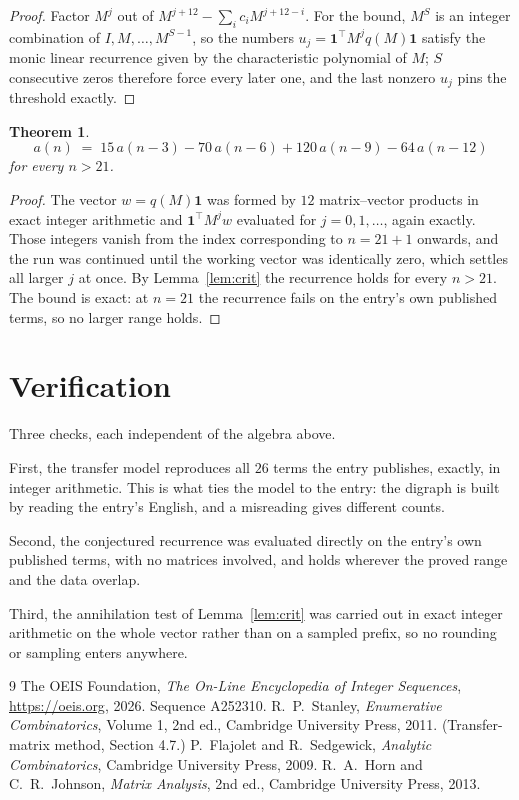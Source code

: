 \documentclass[11pt,a4paper]{article}
\theoremstyle{plain}
\newtheorem{theorem}{Theorem}
\theoremstyle{definition}
\begin{document}
\begin{proof}
Factor $M^{j}$ out of $M^{j+12}-\sum_ic_iM^{j+12-i}$. For the bound, $M^{S}$
is an integer combination of $I,M,\dots,M^{S-1}$, so the numbers
$u_j=\mathbf{1}^{\!\top}M^{j}q(M)\mathbf{1}$ satisfy the monic linear recurrence given by
the characteristic polynomial of $M$; $S$ consecutive zeros therefore force every later one,
and the last nonzero $u_j$ pins the threshold exactly.
\end{proof}

\begin{theorem}
\[
a(n)\;=\;15\,a(n-3) - 70\,a(n-6) + 120\,a(n-9) - 64\,a(n-12)
\]
for every $n>21$.
\end{theorem}

\begin{proof}
The vector $w=q(M)\mathbf{1}$ was formed by $12$ matrix--vector products in exact
integer arithmetic and $\mathbf{1}^{\!\top}M^{j}w$ evaluated for $j=0,1,\dots$, again
exactly. Those integers vanish from the index corresponding to $n=21+1$ onwards, and the
run was continued until the working vector was identically zero, which settles all larger $j$
at once. By Lemma~\ref{lem:crit} the recurrence holds for every $n>21$. The bound is exact: at $n=21$ the recurrence fails on the entry's own published terms, so no larger range holds.
\end{proof}

\section{Verification}

Three checks, each independent of the algebra above.

First, the transfer model reproduces all $26$ terms the entry publishes, exactly, in
integer arithmetic. This is what ties the model to the entry: the digraph is built by reading
the entry's English, and a misreading gives different counts.

Second, the conjectured recurrence was evaluated directly on the entry's own published terms,
with no matrices involved, and holds wherever the proved range and the data overlap.

Third, the annihilation test of Lemma~\ref{lem:crit} was carried out in exact integer
arithmetic on the whole vector rather than on a sampled prefix, so no rounding or sampling
enters anywhere.

\begin{thebibliography}{9}
 The OEIS Foundation, \emph{The On-Line Encyclopedia of Integer
Sequences}, \url{https://oeis.org}, 2026. Sequence A252310.
 R.~P.~Stanley, \emph{Enumerative Combinatorics}, Volume 1, 2nd ed.,
Cambridge University Press, 2011. (Transfer-matrix method, Section 4.7.)
 P.~Flajolet and R.~Sedgewick, \emph{Analytic Combinatorics}, Cambridge
University Press, 2009.
 R.~A.~Horn and C.~R.~Johnson, \emph{Matrix Analysis}, 2nd ed., Cambridge
University Press, 2013.
\end{thebibliography}
\end{document}
